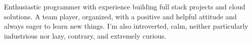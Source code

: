 
\begin{cventries}

\cventry
{}{}{}{}
{
	Enthusiastic programmer with experience building full stack projects and cloud solutions.
	\newline A team player, organized, with a positive and helpful attitude and always eager to learn new things. 
	I'm also introverted, calm, neither particularly industrious nor lazy, contrary, and extremely curious.
}

\end{cventries}